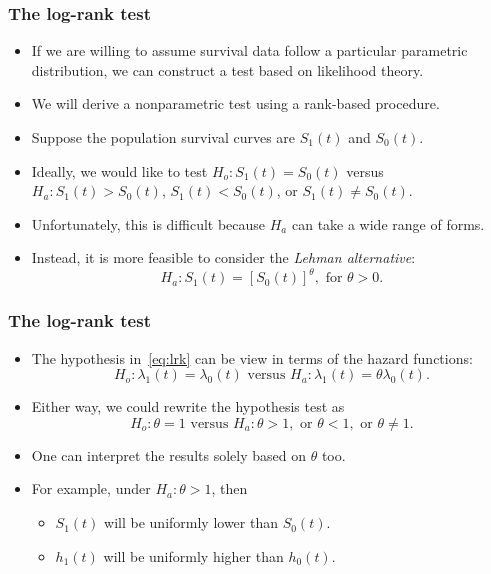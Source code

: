 \documentclass[10pt]{beamer}\usepackage[]{graphicx}\usepackage[]{color}
\newcommand{\empr}[1]{{\emph{\color{red}#1}}}
\begin{document}
\begin{frame}
  \frametitle{The log-rank test}
  \begin{itemize}
  \item If we are willing to assume survival data follow a particular parametric distribution, 
    we can construct a test based on likelihood theory.
  \item We will derive a nonparametric test using a rank-based procedure.
  \item Suppose the population survival curves are $S_1(t)$ and $S_0(t)$.
  \item Ideally, we would like to test $H_o: S_1(t) = S_0(t)$ versus
    $H_a: S_1(t) > S_0(t)$, $S_1(t) < S_0(t)$, or $S_1(t) \ne S_0(t)$.
  \item Unfortunately, this is difficult because $H_a$ can take a wide range of forms.
  \item Instead, it is more feasible to consider the \empr{Lehman alternative}: 
    \begin{equation}
      \label{eq:lrk}
      H_a: S_1(t) = \left[S_0(t)\right]^\theta, \mbox{ for }\theta > 0.
    \end{equation}
  \end{itemize}
\end{frame}

\begin{frame}
  \frametitle{The log-rank test}
  \begin{itemize}
  \item The hypothesis in~\eqref{eq:lrk} can be view in terms of the hazard functions:
    $$H_o: \lambda_1(t) = \lambda_0(t) \mbox{ versus } H_a: \lambda_1(t) = \theta\lambda_0(t).$$
  \item Either way, we could rewrite the hypothesis test as
    $$H_o: \theta = 1 \mbox{ versus } H_a: \theta> 1, \mbox{ or } \theta < 1, \mbox{ or } \theta\ne 1.$$
  \item One can interpret the results solely based on $\theta$ too. 
  \item For example, under $H_a: \theta > 1$, then 
    \begin{itemize}
      \item $S_1(t)$ will be uniformly lower than $S_0(t)$.
      \item $h_1(t)$ will be uniformly higher than $h_0(t)$.
    \end{itemize}
  \end{itemize}
\end{frame}
\end{document}
